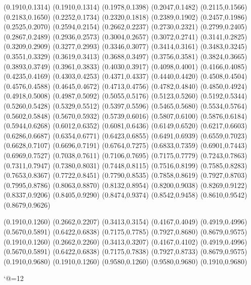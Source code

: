 \PST@Dashed(0.1910,0.1314)
(0.1910,0.1314)
(0.1978,0.1398)
(0.2047,0.1482)
(0.2115,0.1566)
(0.2183,0.1650)
(0.2252,0.1734)
(0.2320,0.1818)
(0.2389,0.1902)
(0.2457,0.1986)
(0.2525,0.2070)
(0.2594,0.2154)
(0.2662,0.2237)
(0.2730,0.2321)
(0.2799,0.2405)
(0.2867,0.2489)
(0.2936,0.2573)
(0.3004,0.2657)
(0.3072,0.2741)
(0.3141,0.2825)
(0.3209,0.2909)
(0.3277,0.2993)
(0.3346,0.3077)
(0.3414,0.3161)
(0.3483,0.3245)
(0.3551,0.3329)
(0.3619,0.3413)
(0.3688,0.3497)
(0.3756,0.3581)
(0.3824,0.3665)
(0.3893,0.3749)
(0.3961,0.3833)
(0.4030,0.3917)
(0.4098,0.4001)
(0.4166,0.4085)
(0.4235,0.4169)
(0.4303,0.4253)
(0.4371,0.4337)
(0.4440,0.4420)
(0.4508,0.4504)
(0.4576,0.4588)
(0.4645,0.4672)
(0.4713,0.4756)
(0.4782,0.4840)
(0.4850,0.4924)
(0.4918,0.5008)
(0.4987,0.5092)
(0.5055,0.5176)
(0.5123,0.5260)
(0.5192,0.5344)
(0.5260,0.5428)
(0.5329,0.5512)
(0.5397,0.5596)
(0.5465,0.5680)
(0.5534,0.5764)
(0.5602,0.5848)
(0.5670,0.5932)
(0.5739,0.6016)
(0.5807,0.6100)
(0.5876,0.6184)
(0.5944,0.6268)
(0.6012,0.6352)
(0.6081,0.6436)
(0.6149,0.6520)
(0.6217,0.6603)
(0.6286,0.6687)
(0.6354,0.6771)
(0.6423,0.6855)
(0.6491,0.6939)
(0.6559,0.7023)
(0.6628,0.7107)
(0.6696,0.7191)
(0.6764,0.7275)
(0.6833,0.7359)
(0.6901,0.7443)
(0.6969,0.7527)
(0.7038,0.7611)
(0.7106,0.7695)
(0.7175,0.7779)
(0.7243,0.7863)
(0.7311,0.7947)
(0.7380,0.8031)
(0.7448,0.8115)
(0.7516,0.8199)
(0.7585,0.8283)
(0.7653,0.8367)
(0.7722,0.8451)
(0.7790,0.8535)
(0.7858,0.8619)
(0.7927,0.8703)
(0.7995,0.8786)
(0.8063,0.8870)
(0.8132,0.8954)
(0.8200,0.9038)
(0.8269,0.9122)
(0.8337,0.9206)
(0.8405,0.9290)
(0.8474,0.9374)
(0.8542,0.9458)
(0.8610,0.9542)
(0.8679,0.9626)

\PST@Fillcircle(0.1910,0.1260)
\PST@Fillcircle(0.2662,0.2207)
\PST@Fillcircle(0.3413,0.3154)
\PST@Fillcircle(0.4167,0.4049)
\PST@Fillcircle(0.4919,0.4996)
\PST@Fillcircle(0.5670,0.5891)
\PST@Fillcircle(0.6422,0.6838)
\PST@Fillcircle(0.7175,0.7785)
\PST@Fillcircle(0.7927,0.8680)
\PST@Fillcircle(0.8679,0.9575)
\PST@Fillsquare(0.1910,0.1260)
\PST@Fillsquare(0.2662,0.2260)
\PST@Fillsquare(0.3413,0.3207)
\PST@Fillsquare(0.4167,0.4102)
\PST@Fillsquare(0.4919,0.4996)
\PST@Fillsquare(0.5670,0.5891)
\PST@Fillsquare(0.6422,0.6838)
\PST@Fillsquare(0.7175,0.7838)
\PST@Fillsquare(0.7927,0.8733)
\PST@Fillsquare(0.8679,0.9575)
\PST@Border(0.1910,0.9680)
(0.1910,0.1260)
(0.9580,0.1260)
(0.9580,0.9680)
(0.1910,0.9680)

\catcode`@=12
\fi
\endpspicture

